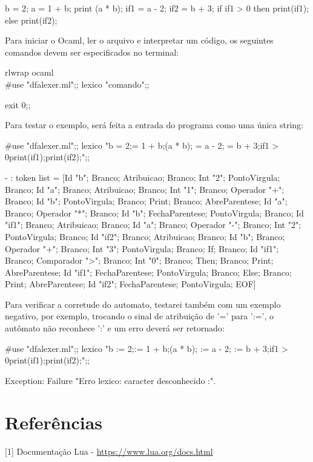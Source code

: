 \documentclass[12pt,a4paper,twoside]{report}
\begin{document}
\begin{terminal}
b = 2;
a = 1 + b;
print (a * b);
if1 = a - 2;
if2 = b + 3;
if if1 > 0
then print(if1);
else print(if2);
\end{terminal}

Para iniciar o Ocaml, ler o arquivo e interpretar um código, os seguintes comandos devem ser especificados no terminal:
\begin{terminal}
rlwrap ocaml \\
#use "dfalexer.ml";;
lexico "comando";;

exit 0;;
\end{terminal}

Para testar o exemplo, será feita a entrada do programa como uma única string:
\begin{terminal}
#use "dfalexer.ml";;
lexico "b = 2;\na = 1 + b;\nprint (a * b); = a - 2; = b + 3;\nif if1 > 0\nthen print(if1);\nelse print(if2);";;

- : token list =
[Id "b"; Branco; Atribuicao; Branco; Int "2"; PontoVirgula; Branco; Id "a";
 Branco; Atribuicao; Branco; Int "1"; Branco; Operador "+"; Branco; Id "b";
 PontoVirgula; Branco; Print; Branco; AbreParentese; Id "a"; Branco;
 Operador "*"; Branco; Id "b"; FechaParentese; PontoVirgula; Branco;
 Id "if1"; Branco; Atribuicao; Branco; Id "a"; Branco; Operador "-"; Branco;
 Int "2"; PontoVirgula; Branco; Id "if2"; Branco; Atribuicao; Branco;
 Id "b"; Branco; Operador "+"; Branco; Int "3"; PontoVirgula; Branco; If;
 Branco; Id "if1"; Branco; Comparador ">"; Branco; Int "0"; Branco; Then;
 Branco; Print; AbreParentese; Id "if1"; FechaParentese; PontoVirgula;
 Branco; Else; Branco; Print; AbreParentese; Id "if2"; FechaParentese;
 PontoVirgula; EOF]
\end{terminal}

Para verificar a corretude do automato, testarei também com um exemplo negativo, por exemplo, trocando o sinal de atribuição de '=' para ':=', o autômato não reconhece ':' e um erro deverá ser retornado:

\begin{terminal}
#use "dfalexer.ml";;
lexico "b := 2;\na := 1 + b;\nprint (a * b); := a - 2; := b + 3;\nif if1 > 0\nthen print(if1);\nelse print(if2);";;

Exception: Failure "Erro lexico: caracter desconhecido :".
\end{terminal}






\chapter{Referências}
[1] Documentação Lua - \url{https://www.lua.org/docs.html}
\end{document}

